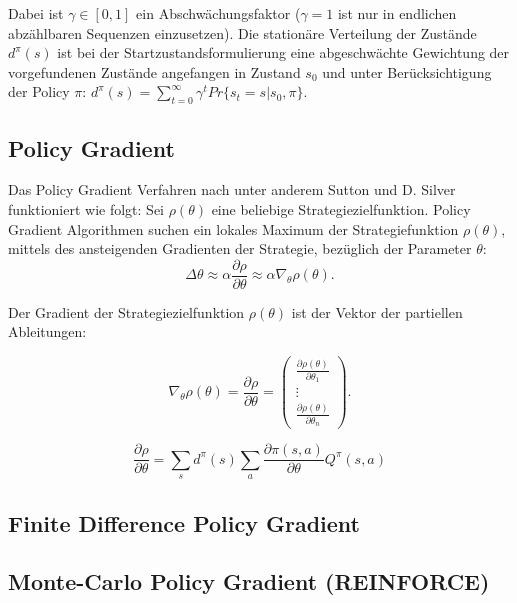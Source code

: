 \documentclass[conference]{IEEEtran}
\begin{document}
Dabei ist $\gamma \in [0,1]$ ein Abschwächungsfaktor ($\gamma = 1$ ist nur in endlichen abzählbaren Sequenzen einzusetzen). Die stationäre Verteilung der Zustände $d^\pi (s)$ ist bei der Startzustandsformulierung eine abgeschwächte Gewichtung der vorgefundenen Zustände angefangen in Zustand $s_0$ und unter Berücksichtigung der Policy $\pi$: $d^\pi (s) = \sum^\infty_{t=0} \gamma^t Pr \{s_t = s | s_0, \pi\}$.
 
\subsection{Policy Gradient}
Das Policy Gradient Verfahren nach unter anderem Sutton \cite{sutton_99} und D. Silver \cite{silver_15} funktioniert wie folgt:
Sei $\rho(\theta)$ eine beliebige Strategiezielfunktion. Policy Gradient Algorithmen suchen ein lokales Maximum der Strategiefunktion $\rho(\theta)$, mittels des ansteigenden Gradienten der Strategie, bezüglich der Parameter $\theta$:   
\begin{equation*}
\Delta \theta \approx \alpha \frac{\partial \rho}{\partial \theta} \approx \alpha \nabla_\theta \rho(\theta).
\end{equation*}

Der Gradient der Strategiezielfunktion $\rho(\theta)$ ist der Vektor der partiellen Ableitungen:

\begin{equation}
\nabla_\theta \rho(\theta) = \frac{\partial \rho}{\partial \theta} =
\begin{pmatrix}
\frac{\partial \rho(\theta)}{\partial \theta_1} \\ 
\vdots \\
\frac{\partial \rho(\theta)}{\partial \theta_n}
\end{pmatrix}.
\end{equation}

\begin{equation}
\frac{\partial \rho}{\partial \theta} = 
\sum_s d^\pi (s) \sum_a \frac{\partial \pi (s,a)}{\partial \theta} 
Q^\pi (s,a)
\end{equation}

\subsection{Finite Difference Policy Gradient}

\subsection{Monte-Carlo Policy Gradient (REINFORCE)}
\end{document}

